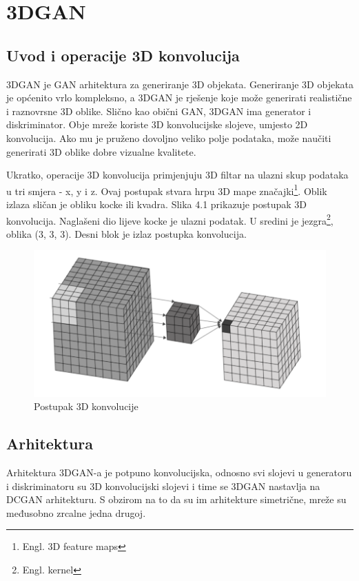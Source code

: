 \documentclass[times, utf8, diplomski]{fer}
\begin{document}
\chapter{3DGAN}
\section{Uvod i operacije 3D konvolucija}
3DGAN je GAN arhitektura za generiranje 3D objekata. Generiranje 3D objekata je općenito vrlo kompleksno, a 3DGAN je rješenje koje može generirati realistične i raznovrsne 3D oblike. Slično kao obični GAN, 3DGAN ima generator i diskriminator. Obje mreže koriste 3D konvolucijske slojeve, umjesto 2D konvolucija. Ako mu je pruženo dovoljno veliko polje podataka, može naučiti generirati 3D oblike dobre vizualne kvalitete. \cite{3dgan1}

Ukratko, operacije 3D konvolucija primjenjuju 3D filtar na ulazni skup podataka u tri smjera - x, y i z. Ovaj postupak stvara hrpu 3D mape značajki\footnote{Engl. 3D feature maps}. Oblik izlaza sličan je obliku kocke ili kvadra. Slika 4.1 prikazuje postupak 3D konvolucija. Naglašeni dio lijeve kocke je ulazni podatak. U sredini je jezgra\footnote{Engl. kernel}, oblika (3, 3, 3). Desni blok je izlaz postupka konvolucija. \cite{3dgan1}

\begin{figure}[h]
\centering
\includegraphics[scale=0.75]{Kocka.png}
\caption{Postupak 3D konvolucije \cite{3dgan1}}
\end{figure}

\newpage

\section{Arhitektura}
Arhitektura 3DGAN-a je potpuno konvolucijska, odnosno svi slojevi u generatoru i diskriminatoru su 3D konvolucijski slojevi i time se 3DGAN nastavlja na DCGAN arhitekturu. S obzirom na to da su im arhitekture simetrične, mreže su međusobno zrcalne jedna drugoj. \cite{3dgan}
\end{document}

